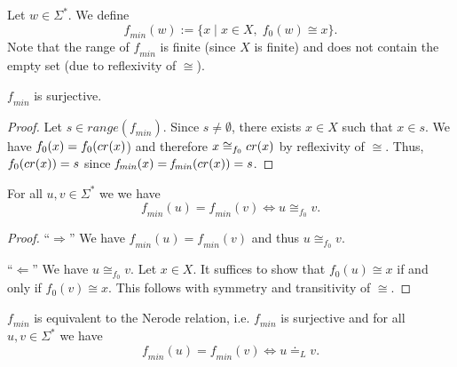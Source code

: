 
\begin{definition}
    \label{f_min}
    Let $w \in \Sigma^*$. We define
    \begin{equation*}
        \mathit{f_{min}}(w) := \{ x \; | \; x \in X, \; {f_0}(w) \cong x \}.
    \end{equation*}
    Note that the range of $\mathit{f_{min}}$ is finite (since $X$ is finite) and does not contain the empty set (due to reflexivity of $\cong$).
\end{definition}

\begin{lemma}
    \label{f_min_surjective}
    $\mathit{f_{min}}$ is surjective.
\end{lemma}
\begin{proof}
    Let $s \in range(\mathit{f_{min}})$. 
    Since $s \neq \emptyset$, 
    there exists $x \in X$ such that $x \in s$.
    We have ${f_0}(x) = {f_0}(cr(x)$) and therefore $x \cong_{f_0} cr(x)$ by reflexivity of $\cong$.
    Thus, ${f_0}(cr(x)) = s$ since  $\mathit{f_{min}}(x) = \mathit{f_{min}}(cr(x)) = s$.
\end{proof}

\begin{lemma}
    \label{f_minP}
    For all $u,v \in \Sigma^*$ we we have 
    \begin{equation*}
        \mathit{f_{min}}(u) = \mathit{f_{min}}(v) \iff u \cong_{f_0} v.
    \end{equation*}
\end{lemma}

\begin{proof}
    ``$\Rightarrow$''
    We have $\mathit{f_{min}}(u) = \mathit{f_{min}}(v)$ and thus $u \cong_{f_0} v$.

    ``$\Leftarrow$''
    We have $u \cong_{f_0} v$. 
    Let $x \in X$.
    It suffices to show that ${f_0}(u) \cong x$ if and only if ${f_0}(v) \cong x$.
    This follows with symmetry and transitivity of $\cong$.
\end{proof}

\begin{lemma}
    \label{f_min_correct}
    $\mathit{f_{min}}$ is equivalent to the Nerode relation, i.e. $\mathit{f_{min}}$ is surjective and for all $u,v \in \Sigma^*$ we have
    \begin{equation*}
        \mathit{f_{min}}(u) = \mathit{f_{min}}(v) \iff u \doteq_L v.
    \end{equation*}
\end{lemma}

